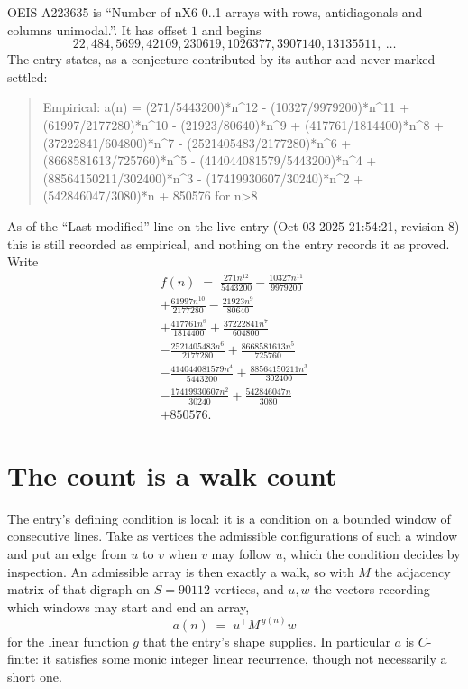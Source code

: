 \documentclass[11pt,a4paper]{article}
\theoremstyle{plain}
\theoremstyle{definition}
\begin{document}
OEIS A223635 is ``Number of nX6 0..1 arrays with rows, antidiagonals and columns unimodal.''. It has offset $1$ and begins
\[
22, 484, 5699, 42109, 230619, 1026377, 3907140, 13135511,\ \dots
\]
The entry states, as a conjecture contributed by its author and never marked settled:
\begin{quote}
Empirical: a(n) = (271/5443200)*n\^{}12 - (10327/9979200)*n\^{}11 + (61997/2177280)*n\^{}10 - (21923/80640)*n\^{}9 + (417761/1814400)*n\^{}8 + (37222841/604800)*n\^{}7 - (2521405483/2177280)*n\^{}6 + (8668581613/725760)*n\^{}5 - (414044081579/5443200)*n\^{}4 + (88564150211/302400)*n\^{}3 - (17419930607/30240)*n\^{}2 + (542846047/3080)*n + 850576 for n>8
\end{quote}
As of the ``Last modified'' line on the live entry (Oct 03 2025 21:54:21, revision 8) this is still
recorded as empirical, and nothing on the entry records it as proved. Write
\begin{multline*}
f(n)\;=\;\frac{271 n^{12}}{5443200} - \frac{10327 n^{11}}{9979200} \\
+ \frac{61997 n^{10}}{2177280} - \frac{21923 n^{9}}{80640} \\
+ \frac{417761 n^{8}}{1814400} + \frac{37222841 n^{7}}{604800} \\
- \frac{2521405483 n^{6}}{2177280} + \frac{8668581613 n^{5}}{725760} \\
- \frac{414044081579 n^{4}}{5443200} + \frac{88564150211 n^{3}}{302400} \\
- \frac{17419930607 n^{2}}{30240} + \frac{542846047 n}{3080} \\
+ 850576.
\end{multline*}

\section{The count is a walk count}

The entry's defining condition is local: it is a condition on a bounded window of consecutive lines. Take as vertices the
admissible configurations of such a window and put an edge from $u$ to $v$ when $v$ may
follow $u$, which the condition decides by inspection. An admissible array is then exactly a
walk, so with $M$ the adjacency matrix of that digraph on $S=90112$ vertices, and $u,w$ the
vectors recording which windows may start and end an array,
\[
a(n)\;=\;u^{\!\top}M^{\,g(n)}w
\]
for the linear function $g$ that the entry's shape supplies. In particular $a$ is
$C$-finite: it satisfies some monic integer linear recurrence, though not necessarily a short
one.
\end{document}
